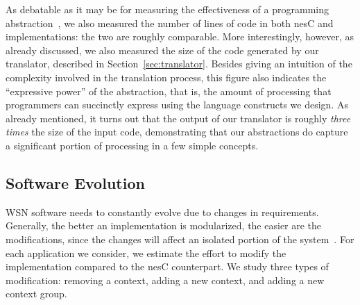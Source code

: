 

As debatable as it may be for measuring the effectiveness of a
programming abstraction~\cite{mottola10:survey}, we also measured the
number of lines of code in both nesC and \conesc implementations: the
two are roughly comparable. More interestingly, however, as already
discussed, we also measured the size of the code generated by our
translator, described in Section~\ref{sec:translator}. Besides giving
an intuition of the complexity involved in the translation process,
this figure also indicates the ``expressive power'' of the
abstraction, that is, the amount of processing that \conesc
programmers can succinctly express using the language constructs we
design. As already mentioned, it turns out that the output of our
translator is roughly \emph{three times} the size of the input code,
demonstrating that our abstractions do capture a significant portion
of processing in a few simple concepts.

\subsection{Software Evolution}\label{sec:evolve}

WSN software needs to constantly evolve due to changes in
requirements. Generally, the better an implementation is modularized,
the easier are the modifications, since the changes will affect an
isolated portion of the system~\cite{koopman10:better}. For each
application we consider, we estimate the effort to modify the \conesc
implementation compared to the nesC counterpart. We study three types
of modification: removing a context, adding a new context, and adding
a new context group.

